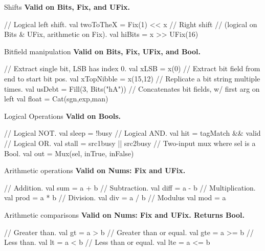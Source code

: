 \documentclass[xcolor=pdflatex,dvipsnames,table]{beamer}
\begin{document}
\begin{frame}[fragile]{Shifts}
\textbf{Valid on Bits, Fix, and UFix.}
\begin{scala}
// Logical left shift.
val twoToTheX = Fix(1) << x   
// Right shift 
// (logical on Bits & UFix, arithmetic on Fix).
val hiBits    = x >> UFix(16) 
\end{scala}
\end{frame}

\begin{frame}[fragile]{Bitfield manipulation}
\textbf{Valid on Bits, Fix, UFix, and Bool.}
\begin{scala}
// Extract single bit, LSB has index 0.
val xLSB       = x(0)                
// Extract bit field  from end to start bit pos. 
val xTopNibble = x(15,12)            
// Replicate a bit string multiple times.
val usDebt     = Fill(3, Bits("hA")) 
// Concatenates bit fields, w/ first arg on left
val float      = Cat(sgn,exp,man)    
\end{scala}
\end{frame}

\begin{frame}[fragile]{Logical Operations}
\textbf{Valid on Bools. }
\begin{scala}
// Logical NOT. 
val sleep = !busy                     
// Logical AND.
val hit   = tagMatch && valid         
// Logical OR.
val stall = src1busy || src2busy      
// Two-input mux where sel is a Bool.  
val out   = Mux(sel, inTrue, inFalse) 
\end{scala}
\end{frame}

\begin{frame}[fragile]{Arithmetic operations}
\textbf{Valid on Nums: Fix and UFix. }
\begin{scala}
// Addition. 
val sum  = a + b  
// Subtraction.
val diff = a - b  
// Multiplication. 
val prod = a * b  
// Division.
val div  = a / b  
// Modulus
val mod  = a %
\end{scala}
\end{frame}

\begin{frame}[fragile]{Arithmetic comparisons}
\textbf{Valid on Nums: Fix and UFix. Returns Bool.}
\begin{scala}
// Greater than.
val gt  = a > b   
// Greater than or equal.
val gte = a >= b  
// Less than.
val lt  = a < b   
// Less than or equal.
val lte = a <= b  
\end{scala}
\end{frame}
\end{document}
